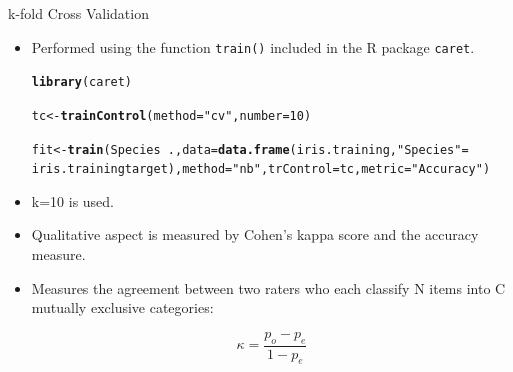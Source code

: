 \documentclass[aspectratio=1610, t]{beamer}\usepackage[]{graphicx}\usepackage[]{color}
\makeatletter
\newcommand{\hlnum}[1]{\textcolor[rgb]{0.686,0.059,0.569}{#1}}%
\newcommand{\hlstr}[1]{\textcolor[rgb]{0.192,0.494,0.8}{#1}}%
\newcommand{\hlopt}[1]{\textcolor[rgb]{0,0,0}{#1}}%
\newcommand{\hlstd}[1]{\textcolor[rgb]{0.345,0.345,0.345}{#1}}%
\newcommand{\hlkwb}[1]{\textcolor[rgb]{0.69,0.353,0.396}{#1}}%
\newcommand{\hlkwc}[1]{\textcolor[rgb]{0.333,0.667,0.333}{#1}}%
\newcommand{\hlkwd}[1]{\textcolor[rgb]{0.737,0.353,0.396}{\textbf{#1}}}%
\newenvironment{kframe}{%
 \def\at@end@of@kframe{}%
 \ifinner\ifhmode%
  \def\at@end@of@kframe{\end{minipage}}%
  \begin{minipage}{\columnwidth}%
 \fi\fi%
 \def\FrameCommand##1{\hskip\@totalleftmargin \hskip-\fboxsep
 \colorbox{shadecolor}{##1}\hskip-\fboxsep
     \hskip-\linewidth \hskip-\@totalleftmargin \hskip\columnwidth}%
 \MakeFramed {\advance\hsize-\width
   \@totalleftmargin\z@ \linewidth\hsize
   \@setminipage}}%
 {\par\unskip\endMakeFramed%
 \at@end@of@kframe}
\newenvironment{knitrout}{}{} %
\makeatother
\begin{document}
\begin{frame}[t]{k-fold Cross Validation}

\begin{itemize}
  \item Performed using the function \texttt{train()} included in the R package \texttt{caret}.
  
\begin{knitrout}\scriptsize
{}\color{fgcolor}\begin{kframe}
\begin{alltt}
\hlkwd{library}\hlstd{(caret)}
\end{alltt}


{\ttfamily\noindent\itshape\color{messagecolor}{\#\# Lade nötiges Paket: ggplot2}}

{\ttfamily\noindent\itshape\color{messagecolor}{\#\# Lade nötiges Paket: lattice}}\begin{alltt}
\hlstd{tc} \hlkwb{<-} \hlkwd{trainControl}\hlstd{(}\hlkwc{method} \hlstd{=} \hlstr{"cv"}\hlstd{,} \hlkwc{number} \hlstd{=} \hlnum{10}\hlstd{)}

\hlstd{fit} \hlkwb{<-} \hlkwd{train}\hlstd{(Species} \hlopt{~}\hlstd{.,}\hlkwc{data} \hlstd{=} \hlkwd{data.frame}\hlstd{(iris.training,}\hlstr{"Species"}\hlstd{=}
              \hlstd{iris.trainingtarget),} \hlkwc{method} \hlstd{=} \hlstr{"nb"}\hlstd{,}\hlkwc{trControl} \hlstd{= tc,} \hlkwc{metric} \hlstd{=} \hlstr{"Accuracy"}\hlstd{)}
\end{alltt}
\end{kframe}
\end{knitrout}

  \item k=10 is used.
  \item Qualitative aspect is measured by Cohen's kappa score and the accuracy measure.  
  \item Measures the agreement between two raters who each classify N items into C mutually exclusive categories:
  
  $$\kappa = \frac{p_o - p_e}{1 - p_e}$$
\end{itemize}
        
\end{frame}
\end{document}
